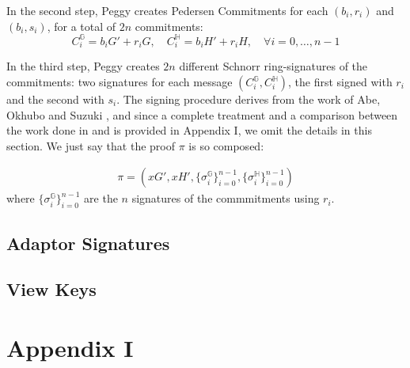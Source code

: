 \documentclass[runningheads]{llncs}
\newcommand{\seq}[2]{#1,\ldots,#2}
\newcommand{\ggroup}{\mathbb{G}}
\newcommand{\hgroup}{\mathbb{H}}
\begin{document}
In the second step, Peggy creates Pedersen Commitments for each $(b_i,r_i)$ and $(b_i,s_i)$, for a total of $2n$ commitments:
$$
C_i^{\ggroup}=b_iG'+r_iG, \quad C_i^{\hgroup}=b_iH'+r_iH, \quad \forall i=\seq 0 {n-1}
$$

In the third step, Peggy creates $2n$ different Schnorr ring-signatures of the commitments: two signatures for each message $(C_i^{\ggroup}, C_i^{\hgroup})$, the first signed with $r_i$ and the second with $s_i$. The signing procedure derives from the work of Abe, Okhubo and Suzuki \cite{abe04}, and since a complete treatment and a comparison between the work done in \cite{dlep} and \cite{abe04} is provided in Appendix I, we omit the details in this section. We just say that the proof $\pi$ is so composed:

\begin{align}
    \pi=(xG', xH', \{\sigma_i^{\ggroup}\}_{i=0}^{n-1}, \{\sigma_i^{\hgroup}\}_{i=0}^{n-1})
\end{align}
\noindent where $\{\sigma_i^{\ggroup}\}_{i=0}^{n-1}$ are the $n$ signatures of the commmitments using $r_i$.
\subsection{Adaptor Signatures}\label{sec_adaptorsignatures}
\subsection{View Keys}\label{sec_viewkeys}
%
%
%



\section*{Appendix I}\label{apx:I}

%
\end{document}
